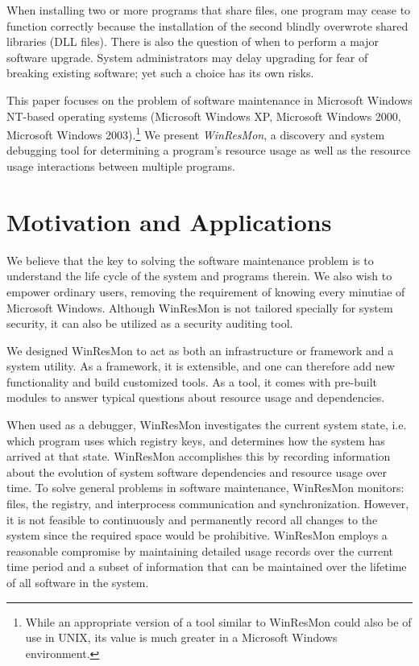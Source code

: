 When installing two or more programs that share files, one program may cease to
function correctly because the installation of the second blindly overwrote 
shared libraries (DLL files).  There is also the question of when to perform a
major software upgrade.  System administrators may delay upgrading
for fear of breaking existing software; yet such a choice has its own risks.

This paper focuses on the problem of software
maintenance in Microsoft Windows NT-based operating systems (Microsoft Windows
XP, Microsoft Windows 2000, Microsoft Windows 2003).\footnote{ While an
appropriate version of a tool similar to WinResMon could also be of use in UNIX,
its value is much greater in a Microsoft Windows environment.  } We present {\em WinResMon},
a discovery and system debugging tool for
determining a program's resource usage as well as the resource usage
interactions between multiple programs.


\section{Motivation and Applications}

We believe that the key to solving the software maintenance problem is to
understand the life cycle of the system and programs therein.  We also wish
to empower ordinary users, removing the requirement of knowing every minutiae
of Microsoft Windows.  Although WinResMon is not tailored specially for system
security, it can also be utilized as a security auditing tool.

We designed WinResMon to act as both an infrastructure or framework
and a system utility.  
As a framework, it is extensible, and one can therefore add
new functionality and build customized tools.  As a tool, it comes with
pre-built modules to answer typical questions about resource usage and
dependencies.

When used as a debugger, WinResMon investigates the current system state,
i.e. which program uses which registry keys, and determines how the system has
arrived at that state.  WinResMon accomplishes this by recording information
about the evolution of system software dependencies and resource usage over
time.  To solve general problems in software maintenance, WinResMon monitors:
files, the registry, and interprocess communication and synchronization.
However, it is not feasible to continuously and permanently record all changes
to the system since the required space would be prohibitive.  
WinResMon employs
a reasonable compromise by maintaining detailed usage records 
over the current time period and a
subset of information that can be maintained over the lifetime 
of all software in the system.

